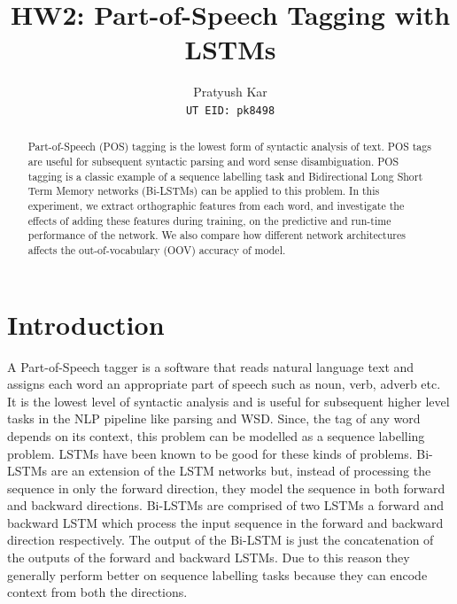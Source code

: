 \documentclass[11pt,letterpaper]{article}
\title{HW2: Part-of-Speech Tagging with LSTMs}
\author{Pratyush Kar\\
  {\tt UT EID: pk8498}}
\date{}
\begin{document}
\maketitle

\begin{abstract}
  Part-of-Speech (POS) tagging is the lowest form of syntactic analysis of text. POS tags are useful for subsequent syntactic parsing and word sense disambiguation. POS tagging is a classic example of a sequence labelling task and Bidirectional Long Short Term Memory networks (Bi-LSTMs) can be applied to this problem. In this experiment, we extract orthographic features from each word, and investigate the effects of adding these features during training, on the predictive and run-time performance of the network. We also compare how different network architectures affects the out-of-vocabulary (OOV) accuracy of model.
\end{abstract}

\section{Introduction}
A Part-of-Speech tagger is a software that reads natural language text and assigns each word an appropriate part of speech such as noun, verb, adverb etc. It is the lowest level of syntactic analysis and is useful for subsequent higher level tasks in the NLP pipeline like parsing and WSD. Since, the tag of any word depends on its context, this problem can be modelled as a sequence labelling problem. LSTMs have been known to be good for these kinds of problems. Bi-LSTMs are an extension of the LSTM networks but, instead of processing the sequence in only the forward direction, they model the sequence in both forward and backward directions. Bi-LSTMs are comprised of two LSTMs a forward and backward LSTM which process the input sequence in the forward and backward direction respectively. The output of the Bi-LSTM is just the concatenation of the outputs of the forward and backward LSTMs. Due to this reason they generally perform better on sequence labelling tasks because they can encode context from both the directions.
\end{document}
